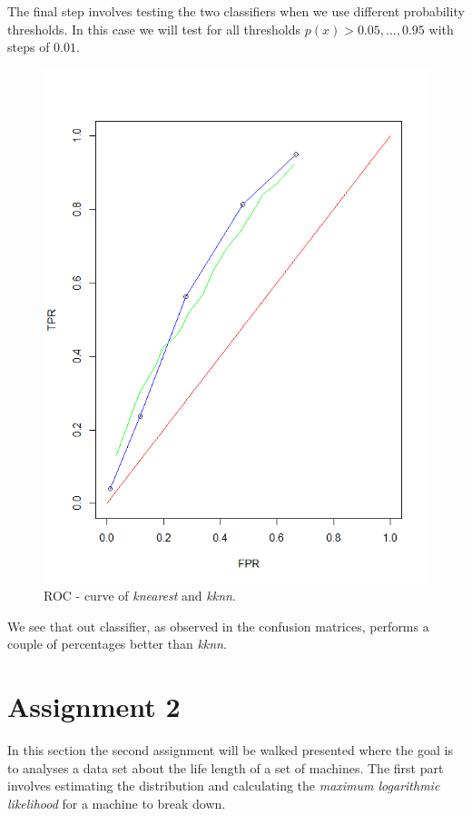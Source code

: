 \documentclass[a4paper,12pt]{article}
\begin{document}
The final step involves testing the two classifiers when we use different probability thresholds. In this case we will test for all thresholds \( p(x) > 0.05,...,0.95\) with steps of \(0.01\).
\begin{figure}[H]
\centering
\begin{minipage}[]{0.5\textwidth}
  \includegraphics[width=\textwidth]{figures/Lab1_A1_ROC.png}  
  \caption{ROC - curve of  \textit{knearest} and  \textit{kknn}.\label{fig:ROC - curve} }
 \end{minipage}
\end{figure}
We see that out classifier, as observed in the confusion matrices, performs a couple of percentages better than \textit{kknn}.


\section{Assignment 2}

In this section the second assignment will be walked presented where the goal is to analyses a data set about the life length of a set of machines. The first part involves estimating the distribution and calculating the \textit{maximum logarithmic likelihood} for a machine to break down. 
\end{document}
